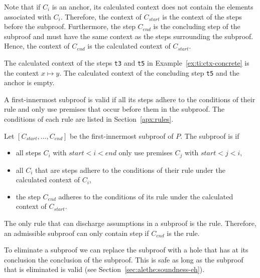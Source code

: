 \documentclass{scrartcl}
\begin{document}
Note that if $C_i$ is an anchor, its calculated context does not
contain the elements associated with $C_i$.
Therefore, the context of $C_{\mathit{start}}$
is the context of the steps before the subproof.
Furthermore, the step $C_{\mathit{end}}$ is the concluding
step of the subproof and must have the same context as the steps surrounding
the subproof.
Hence, the context of $C_{\mathit{end}}$ is the calculated
context of $C_{\mathit{start}}$.

\begin{example}
The calculated context of the steps \texttt{\color{SmtStepId}t3} and \texttt{\color{SmtStepId}t5} in
Example~\ref{ex:ti:ctx-concrete} is the context $x \mapsto y$.
The calculated context of the concluding step \texttt{\color{SmtStepId}t5} and the anchor is empty.
\end{example}

\noindent
A first-innermost subproof is valid if all its steps adhere to
the conditions of their rule and only use premises that occur before them
in the subproof.  The conditions of each rule are listed in
Section~\ref{apx:rules}.

\begin{definition}
  Let $[C_{\mathit{start}}, \dots, C_{\mathit{end}}]$
  be the first-innermost subproof of $P$.
  The subproof is  if
  \begin{itemize}
    \item all steps $C_i$ with $\mathit{start} < i <
    \mathit{end}$ only use premises $C_j$ with $\mathit{start} <
    j < i$,
    \item all $C_i$ that are steps adhere to the conditions of their
    rule under the calculated context of $C_i$,
    \item the step $C_{\mathit{end}}$
    adheres to the conditions of its
    rule under the calculated context of $C_{\mathit{start}}$.
  \end{itemize}
\end{definition}

The only rule that can discharge assumptions in a subproof is the
 rule.  Therefore, an admissible subproof can only
contain  step if $C_{\mathit{end}}$
is the  rule.

To eliminate a subproof we can replace the subproof with a hole that has
at its conclusion the conclusion of the subproof.  This is safe as long
as the subproof that is eliminated is valid (see Section~\ref{sec:alethe:soundness-eh}).
\end{document}
